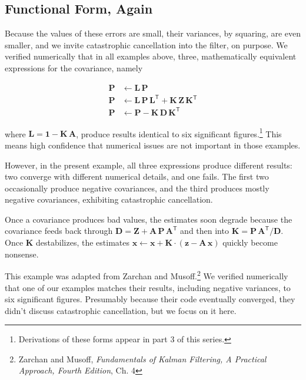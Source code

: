 \documentclass[10pt,oneside,x11names]{article}
\begin{document}
\subsection{Functional Form, Again}
\label{sec:orgheadline22}

Because the values of these errors are small, their variances, by squaring, are
even smaller, and we invite catastrophic cancellation into the filter, on
purpose. We verified numerically that in all examples above, three,
mathematically equivalent expressions for the covariance, namely

\begin{align}
\mathbold{P} &\leftarrow
\mathbold{L}\,
\mathbold{P}
\\
\mathbold{P} &\leftarrow
\mathbold{L}\,
\mathbold{P}\,
\mathbold{L}^{\mathsf{T}} +
\mathbold{K}\,
\mathbold{Z}\,
\mathbold{K}^{\mathsf{T}}
\\
\mathbold{P} &\leftarrow
\mathbold{P} -
\mathbold{K}\,
\mathbold{D}\,
\mathbold{K}^{\mathsf{T}}
\end{align}

\noindent where \(\mathbold{L}=\mathbold{1}-\mathbold{K}\,\mathbold{A}\),
produce results identical to six significant figures.\footnote{Derivations of
  these forms appear in part 3 of this series.} This means high confidence that
numerical issues are not important in those examples.

However, in the present example, all three expressions produce different
results: two converge with different numerical details, and one fails. The first
two occasionally produce negative covariances, and the third produces mostly
negative covariances, exhibiting catastrophic cancellation.

Once a covariance produces bad values, the estimates soon degrade because the
covariance feeds back through
\(\mathbold{D}=\mathbold{Z}+\mathbold{A}\,\mathbold{P}\,\mathbold{A}^{\mathsf{T}}\)
and then into \(\mathbold{K}=\mathbold{P}\,\mathbold{A}^{\mathsf{T}}/\mathbold{D}\).
Once \(\mathbold{K}\) destabilizes, the estimates
\(\mathbold{x}\leftarrow\mathbold{x}+\mathbold{K}\cdot(\mathbold{z}-\mathbold{A}\,\mathbold{x})\)
quickly become nonsense.

This example was adapted from Zarchan and Musoff.\footnote{Zarchan and Musoff, \emph{Fundamentals of Kalman Filtering, A Practical
Approach, Fourth Edition}, Ch. 4} We verified
numerically that one of our examples matches their results, including negative
variances, to six significant figures. Presumably because their code eventually
converged, they didn't discuss catastrophic cancellation, but we focus on it
here.
\end{document}

